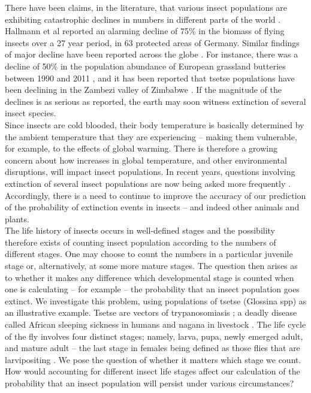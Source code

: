 There have been claims, in the literature, that various insect populations are exhibiting catastrophic declines in numbers in different parts of the world \cite{Conrad2002,Potts2010,Ilyinykh2011,VanSwaay2013,Lister2018}. Hallmann et al \cite{Hallmann2017} reported an alarming decline of 75\% in the biomass of flying insects over a 27 year period, in 63 protected areas of Germany. Similar findings of major decline have been reported across the globe \cite{Habel2015,Pelton2019}. For instance, there was a decline of 50\% in the population abundance of European grassland butteries between 1990 and 2011 \cite{VanSwaay2013}, and it has been reported that tsetse populations have been declining in the Zambezi valley of Zimbabwe \cite{Lord2018}. If the magnitude of the declines is as serious as reported, the earth may soon witness extinction of several insect species.\\


  
Since insects are cold blooded, their body temperature is basically determined by the ambient temperature that they are experiencing – making them vulnerable, for example, to the effects of global warming. There is therefore a growing concern about how increases in global temperature, and other environmental disruptions, will impact insect populations. In recent years, questions involving extinction of several insect populations are now being asked more frequently \cite{Nilsson2017}. Accordingly, there is a need to continue to improve the accuracy of our prediction of the probability of extinction events in insects – and indeed other animals and plants. \\


The life history of insects occurs in well-defined stages and the possibility therefore exists of counting insect population according to the numbers of different stages. One may choose to count the numbers in a particular juvenile stage or, alternatively, at some more mature stages. The question then arises as to whether it makes any difference which developmental stage is counted when one is calculating – for example – the probability that an insect population goes extinct.  We investigate this problem, using populations of tsetse (Glossina spp) as an illustrative example. Tsetse are vectors of trypanosomiasis \cite{Wamwiri2016,Kioy2004}; a deadly disease called African sleeping sickness in humans and nagana in livestock \cite{Kioy2004}. The life cycle of the fly involves four distinct stages; namely, larva, pupa, newly emerged adult, and mature adult – the last stage in females being defined as those flies that are larvipositing \cite{Ackley2017a}. We pose the question of whether it matters which stage we count. How would accounting for different insect life stages affect our calculation of the probability that an insect population will persist under various circumstances? \\


